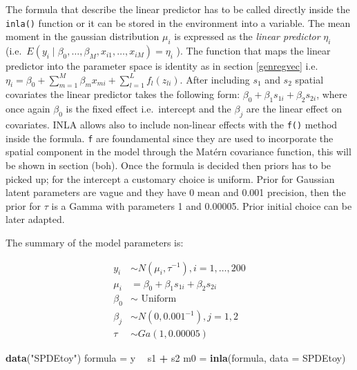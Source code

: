 \documentclass[
  12pt,
  a4paper,
  oneside]{book}
\newenvironment{Shaded}{\begin{snugshade}}{\end{snugshade}}
\newcommand{\DataTypeTok}[1]{\textcolor[rgb]{0.13,0.29,0.53}{#1}}
\newcommand{\KeywordTok}[1]{\textcolor[rgb]{0.13,0.29,0.53}{\textbf{#1}}}
\newcommand{\NormalTok}[1]{#1}
\newcommand{\OperatorTok}[1]{\textcolor[rgb]{0.81,0.36,0.00}{\textbf{#1}}}
\newcommand{\StringTok}[1]{\textcolor[rgb]{0.31,0.60,0.02}{#1}}
\theoremstyle{definition}
\theoremstyle{definition}
\theoremstyle{definition}
\theoremstyle{remark}
\begin{document}
The formula that describe the linear predictor has to be called directly inside the \texttt{inla()} function or it can be stored in the environment into a variable. The mean moment in the gaussian distribution \(\mu_{i}\) is expressed as the \emph{linear predictor} \(\eta_{i}\) (i.e.~\(E\left(y_{i} \mid \beta_{0}, \ldots, \beta_{M}, x_{i 1}, \ldots, x_{i M}\right) = \eta_{i}\) ). The function that maps the linear predictor into the parameter space is identity as in section \ref{genregvec} i.e.~\(\eta_{i}=\beta_{0}+\sum_{m=1}^{M} \beta_{m} x_{m i}+\sum_{l=1}^{L} f_{l}\left(z_{l i}\right)\).
After including \(s_{1}\) and \(s_{2}\) spatial covariates the linear predictor takes the following form: \(\beta_{0}+\beta_{1} s_{1 i}+\beta_{2} s_{2 i}\), where once again \(\beta_{0}\) is the fixed effect i.e.~intercept and the \(\beta_{j}\) are the linear effect on covariates. INLA allows also to include non-linear effects with the \texttt{f()} method inside the formula. \texttt{f} are foundamental since they are used to incorporate the spatial component in the model through the Matérn covariance function, this will be shown in section (boh).
Once the formula is decided then priors has to be picked up; for the intercept a customary choice is uniform. Prior for Gaussian latent parameters are vague and they have 0 mean and 0.001 precision, then the prior for \(\tau\) is a Gamma with parameters 1 and 0.00005. Prior initial choice can be later adapted.

The summary of the model parameters is:

\[
\begin{aligned}
y_{i} & \sim N\left(\mu_{i}, \tau^{-1}\right), i=1, \ldots, 200 \\
\mu_{i} &=\beta_{0}+\beta_{1} s_{1 i}+\beta_{2} s_{2 i} \\
\beta_{0} & \sim \text { Uniform } \\
\beta_{j} & \sim N\left(0,0.001^{-1}\right), j=1,2 \\
\tau & \sim G a(1,0.00005)
\end{aligned}
\]

\begin{Shaded}
\begin{Highlighting}[]
\KeywordTok{data}\NormalTok{(}\StringTok{"SPDEtoy"}\NormalTok{)}
\NormalTok{formula =}\StringTok{ }\NormalTok{y }\OperatorTok{~}\StringTok{ }\NormalTok{s1 }\OperatorTok{+}\StringTok{ }\NormalTok{s2}
\NormalTok{m0 =}\StringTok{ }\KeywordTok{inla}\NormalTok{(formula, }\DataTypeTok{data =}\NormalTok{ SPDEtoy)}
\end{Highlighting}
\end{Shaded}
\end{document}

